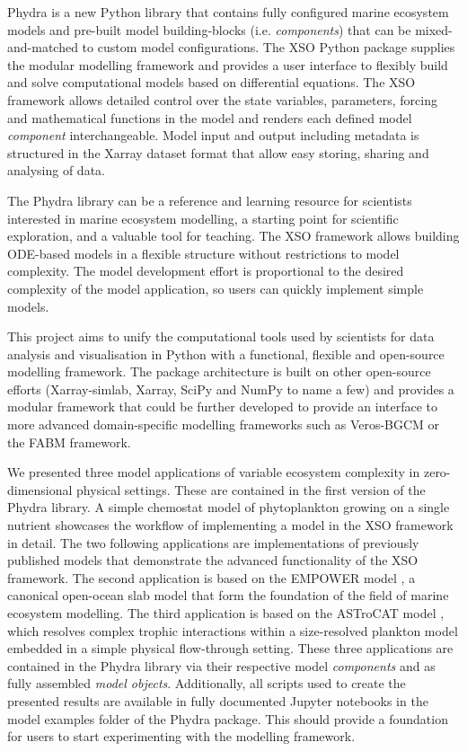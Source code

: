\documentclass[journal abbreviation, manuscript]{copernicus}
\begin{document}
Phydra is a new Python library that contains fully configured marine ecosystem models and pre-built model building-blocks (i.e. \textit{components}) that can be mixed-and-matched to custom model configurations. The XSO Python package supplies the modular modelling framework and provides a user interface to flexibly build and solve computational models based on differential equations. The XSO framework allows detailed control over the state variables, parameters, forcing and mathematical functions in the model and renders each defined model \textit{component} interchangeable. Model input and output including metadata is structured in the Xarray dataset format that allow easy storing, sharing and analysing of data.

The Phydra library can be a reference and learning resource for scientists interested in marine ecosystem modelling, a starting point for scientific exploration, and a valuable tool for teaching. The XSO framework allows building ODE-based models in a flexible structure without restrictions to model complexity. The model development effort is proportional to the desired complexity of the model application, so users can quickly implement simple models.

This project aims to unify the computational tools used by scientists for data analysis and visualisation in Python with a functional, flexible and open-source modelling framework. The package architecture is built on other open-source efforts (Xarray-simlab, Xarray, SciPy and NumPy to name a few) and provides a modular framework that could be further developed to provide an interface to more advanced domain-specific modelling frameworks such as Veros-BGCM or the FABM framework.

We presented three model applications of variable ecosystem complexity in zero-dimensional physical settings. These are contained in the first version of the Phydra library. A simple chemostat model of phytoplankton growing on a single nutrient showcases the workflow of implementing a model in the XSO framework in detail. The two following applications are implementations of previously published models that demonstrate the advanced functionality of the XSO framework. The second application is based on the EMPOWER model \citep{Anderson2015c}, a canonical open-ocean slab model that form the foundation of the field of marine ecosystem modelling. The third application is based on the ASTroCAT model \citep{Banas2011b}, which resolves complex trophic interactions within a size-resolved plankton model embedded in a simple physical flow-through setting. These three applications are contained in the Phydra library via their respective model \textit{components} and as fully assembled \textit{model objects}. Additionally, all scripts used to create the presented results are available in fully documented Jupyter notebooks in the model examples folder of the Phydra package. This should provide a foundation for users to start experimenting with the modelling framework. 
\end{document}
